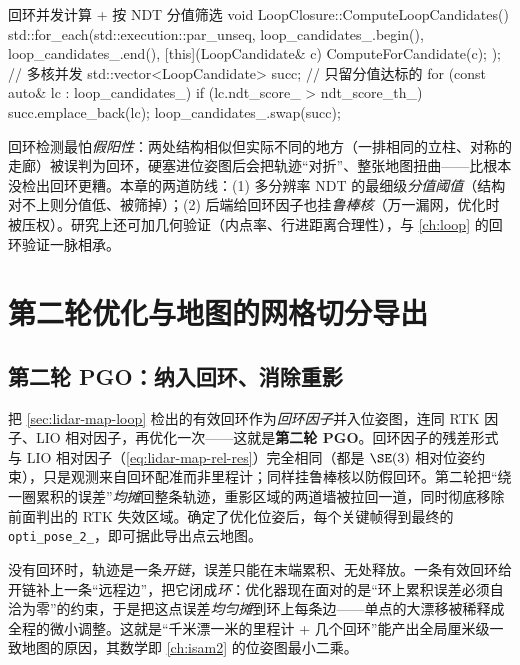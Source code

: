 \begin{codebox}[C++]{回环并发计算 + 按 NDT 分值筛选}
void LoopClosure::ComputeLoopCandidates() {
  std::for_each(std::execution::par_unseq, loop_candidates_.begin(), loop_candidates_.end(),
      [this](LoopCandidate& c) { ComputeForCandidate(c); });   // 多核并发
  std::vector<LoopCandidate> succ;                              // 只留分值达标的
  for (const auto& lc : loop_candidates_)
    if (lc.ndt_score_ > ndt_score_th_) succ.emplace_back(lc);
  loop_candidates_.swap(succ);
}
\end{codebox}

\begin{pitfall}[假回环比没回环更危险]
回环检测最怕\emph{假阳性}：两处结构相似但实际不同的地方（一排相同的立柱、对称的走廊）被误判为回环，硬塞进位姿图后会把轨迹“对折”、整张地图扭曲——比根本没检出回环更糟。本章的两道防线：(1) 多分辨率 NDT 的最细级\emph{分值阈值}（结构对不上则分值低、被筛掉）；(2) 后端给回环因子也挂\emph{鲁棒核}（万一漏网，优化时被压权）。研究上还可加几何验证（内点率、行进距离合理性），与 \cref{ch:loop} 的回环验证一脉相承。
\end{pitfall}

\section{第二轮优化与地图的网格切分导出}
\label{sec:lidar-map-export}

\subsection{第二轮 PGO：纳入回环、消除重影}
\label{sec:lidar-map-pgo2}

把 \cref{sec:lidar-map-loop} 检出的有效回环作为\emph{回环因子}并入位姿图，连同 RTK 因子、LIO 相对因子，再优化一次——这就是\textbf{第二轮 PGO}\cite{gao2023slamad}。回环因子的残差形式与 LIO 相对因子（\cref{eq:lidar-map-rel-res}）完全相同（都是 $\SE(3)$ 相对位姿约束），只是观测来自回环配准而非里程计；同样挂鲁棒核以防假回环。第二轮把“绕一圈累积的误差”\emph{均摊}回整条轨迹，重影区域的两道墙被拉回一道，同时彻底移除前面判出的 RTK 失效区域。确定了优化位姿后，每个关键帧得到最终的 \texttt{opti\_pose\_2\_}，即可据此导出点云地图。

\begin{insight}
没有回环时，轨迹是一条\emph{开链}，误差只能在末端累积、无处释放。一条有效回环给开链补上一条“远程边”，把它闭成\emph{环}：优化器现在面对的是“环上累积误差必须自洽为零”的约束，于是把这点误差\emph{均匀摊}到环上每条边——单点的大漂移被稀释成全程的微小调整。这就是“千米漂一米的里程计 + 几个回环”能产出全局厘米级一致地图的原因，其数学即 \cref{ch:isam2} 的位姿图最小二乘。
\end{insight}

